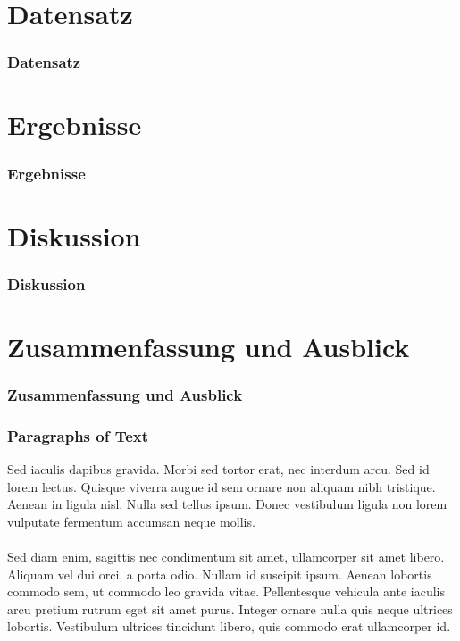 \documentclass{beamer}
\begin{document}
\section{Datensatz}

\begin{frame}
	\frametitle{Datensatz}
\end{frame}

\section{Ergebnisse}

\begin{frame}
	\frametitle{Ergebnisse}
\end{frame}

\section{Diskussion}

\begin{frame}
	\frametitle{Diskussion}
\end{frame}

\section{Zusammenfassung und Ausblick}

\begin{frame}
	\frametitle{Zusammenfassung und Ausblick}
\end{frame}


\begin{frame}
	\frametitle{Paragraphs of Text}
	Sed iaculis dapibus gravida. Morbi sed tortor erat, nec interdum arcu. Sed id lorem lectus. Quisque viverra augue id sem ornare non aliquam nibh tristique. Aenean in ligula nisl. Nulla sed tellus ipsum. Donec vestibulum ligula non lorem vulputate fermentum accumsan neque mollis.\\~\\
	
	Sed diam enim, sagittis nec condimentum sit amet, ullamcorper sit amet libero. Aliquam vel dui orci, a porta odio. Nullam id suscipit ipsum. Aenean lobortis commodo sem, ut commodo leo gravida vitae. Pellentesque vehicula ante iaculis arcu pretium rutrum eget sit amet purus. Integer ornare nulla quis neque ultrices lobortis. Vestibulum ultrices tincidunt libero, quis commodo erat ullamcorper id.
\end{frame}
\end{document}
